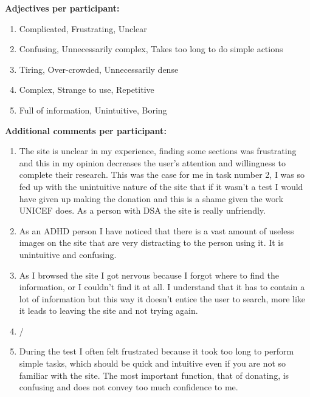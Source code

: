 \textbf{Adjectives per participant:}
\begin{enumerate}
	\item Complicated, Frustrating, Unclear
	\item Confusing, Unnecessarily complex, Takes too long to do simple actions
	\item Tiring, Over-crowded, Unnecessarily dense
	\item Complex, Strange to use, Repetitive
	\item Full of information, Unintuitive, Boring
\end{enumerate}

\vspace{0.25cm}

\textbf{Additional comments per participant:}
\begin{enumerate}
	\item The site is unclear in my experience, finding some sections was frustrating and this in my opinion decreases the user's attention and willingness to complete their research. This was the case for me in task number 2, I was so fed up with the unintuitive nature of the site that if it wasn't a test I would have given up making the donation and this is a shame given the work UNICEF does. As a person with DSA the site is really unfriendly.
	\item As an ADHD person I have noticed that there is a vast amount of useless images on the site that are very distracting to the person using it. It is unintuitive and confusing.
	\item As I browsed the site I got nervous because I forgot where to find the information, or I couldn't find it at all. I understand that it has to contain a lot of information but this way it doesn't entice the user to search, more like it leads to leaving the site and not trying again.
	\item /
	\item During the test I often felt frustrated because it took too long to perform simple tasks, which should be quick and intuitive even if you are not so familiar with the site. The most important function, that of donating, is confusing and does not convey too much confidence to me.
\end{enumerate}